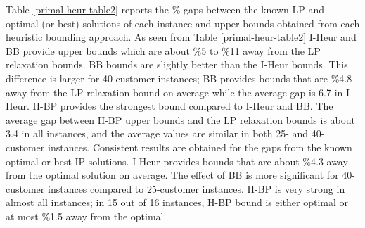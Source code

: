 Table  \ref{primal-heur-table2} reports the \% gaps between the known LP and optimal (or best)
solutions of each instance and upper bounds obtained from each heuristic bounding approach.
As seen from Table \ref{primal-heur-table2} I-Heur and BB provide upper bounds which are
about \%5 to \%11 away from the LP relaxation bounds. BB bounds are slightly better than the I-Heur
bounds. This difference is larger for 40 customer instances; BB provides bounds that are \%4.8
away from the LP relaxation bound on average while the average gap is 6.7 in I-Heur.
H-BP provides the strongest bound compared to I-Heur and BB.
The average gap between H-BP upper bounds and the LP relaxation bounds is
about 3.4 in all instances, and the average values are similar in both 25- and 40-customer
instances. Consistent results are obtained for the gaps from the known optimal or best
IP solutions. I-Heur provides bounds that are about \%4.3 away from the optimal
solution on average. The effect of BB is more significant for 40-customer instances
compared to 25-customer instances. H-BP is very strong in almost all instances;
in 15 out of 16 instances, H-BP bound is either optimal or at most \%1.5 away
from the optimal.

